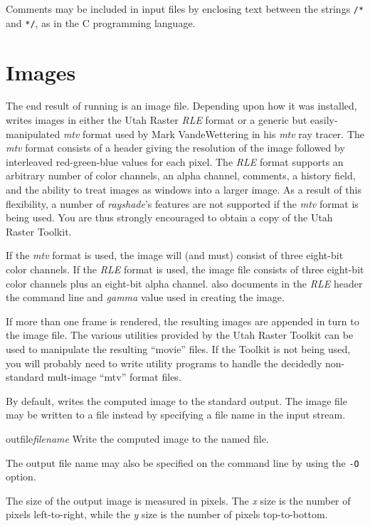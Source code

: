 Comments may be included in \rayshade input files by enclosing
text between the strings \verb!/*! and \verb!*/!, as in the C
programming
language.

\section{Images}

The end result of running \rayshade is an image file.  Depending upon
how it was installed, \rayshade writes images in either the Utah Raster
{\em RLE} format or a generic but easily-manipulated {\em mtv} format
used by Mark VandeWettering in his {\em mtv} ray tracer.  The {\em mtv}
format consists of a header giving the resolution of the image followed
by interleaved red-green-blue values for each pixel.  The {\em RLE} format
supports an arbitrary number of color channels,
an alpha channel, comments, a history field, and the ability
to treat images as windows into a larger image.  As a result of this
flexibility, a number of {\em rayshade}'s features
are not
supported if the {\em mtv} format is being used. You are thus strongly
encouraged to obtain a copy of the Utah Raster Toolkit.

If the {\em mtv}
format is used, the image will (and must) consist of three eight-bit
color channels.
If the {\em RLE} format is used, the image file consists of three
eight-bit color channels plus an eight-bit alpha channel.  \Rayshade
also documents in the {\em RLE} header the command line and {\em gamma}
value used in creating the image.

If more than one frame is rendered, the resulting images are appended
in turn
to the image file.  The various utilities provided by the
Utah Raster Toolkit can be used to manipulate the resulting ``movie''
files.
If the Toolkit is not being used, you will probably need to write
utility programs to handle the decidedly non-standard mult-image ``mtv''
format files.

By default, \rayshade writes the computed image to the standard output.
The image file may be written to a file instead by specifying a file name
in the input stream.

\begin{defkey}{outfile}{{\em filename}}
	Write the computed image to the named file.
\end{defkey}
The output file name may also be specified on the command line by
using the {\tt -O} option.

The size of the output image is measured in pixels.  The {\em x} size
is the number of pixels left-to-right, while the {\em y} size is
the number of pixels top-to-bottom.

